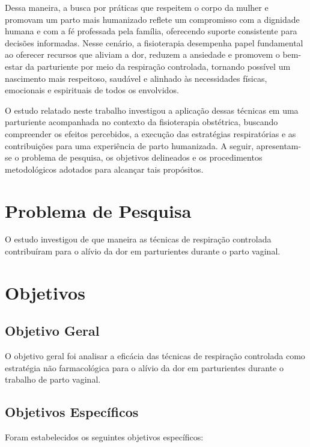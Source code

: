 \documentclass[openright]{tex/estilos/normas-utf-tex}
\begin{document}
Dessa maneira, a busca por práticas que respeitem o corpo da mulher e promovam um parto mais humanizado reflete um compromisso com a dignidade humana e com a fé professada pela família, oferecendo suporte consistente para decisões informadas. Nesse cenário, a fisioterapia desempenha papel fundamental ao oferecer recursos que aliviam a dor, reduzem a ansiedade e promovem o bem-estar da parturiente por meio da respiração controlada, tornando possível um nascimento mais respeitoso, saudável e alinhado às necessidades físicas, emocionais e espirituais de todos os envolvidos.

O estudo relatado neste trabalho investigou a aplicação dessas técnicas em uma parturiente acompanhada no contexto da fisioterapia obstétrica, buscando compreender os efeitos percebidos, a execução das estratégias respiratórias e as contribuições para uma experiência de parto humanizada. A seguir, apresentam-se o problema de pesquisa, os objetivos delineados e os procedimentos metodológicos adotados para alcançar tais propósitos.

\section{Problema de Pesquisa}
\label{sec:problema}

O estudo investigou de que maneira as técnicas de respiração controlada contribuíram para o alívio da dor em parturientes durante o parto vaginal.

\section{Objetivos}
\label{sec:objetivos}

\subsection{Objetivo Geral}
\label{subsec:objetivo-geral}

O objetivo geral foi analisar a eficácia das técnicas de respiração controlada como estratégia não farmacológica para o alívio da dor em parturientes durante o trabalho de parto vaginal.

\subsection{Objetivos Específicos}
\label{subsec:objetivos-especificos}

Foram estabelecidos os seguintes objetivos específicos:
\end{document}
